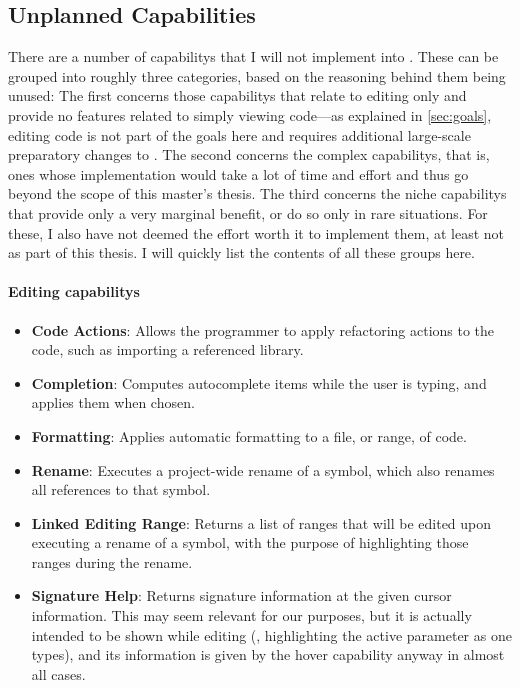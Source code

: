 \documentclass[../thesis]{subfiles}
\begin{document}
\subsection{Unplanned Capabilities}\label{subsec:unplanned}
There are a number of \glspl{capability} that I will not implement into \SEE{}.
These can be grouped into roughly three categories, based on the reasoning behind them being unused:
The first concerns those \glspl{capability} that relate to editing only and provide no features related to simply viewing code---as explained in \cref{sec:goals}, editing code is not part of the goals here and requires additional large-scale preparatory changes to \SEE{}.
The second concerns the complex \glspl{capability}, that is, ones whose implementation would take a lot of time and effort and thus go beyond the scope of this master's thesis.
The third concerns the niche \glspl{capability} that provide only a very marginal benefit, or do so only in rare situations.
For these, I also have not deemed the effort worth it to implement them, at least not as part of this thesis.
I will quickly list the contents of all these groups here.

\paragraph{Editing \glspl{capability}}
\begin{itemize}
	\item \textbf{Code Actions}: Allows the programmer to apply refactoring actions to the code, such as importing a referenced library.
	\item \textbf{Completion}: Computes autocomplete items while the user is typing, and applies them when chosen.
	\item \textbf{Formatting}: Applies automatic formatting to a file, or range, of code.
	\item \textbf{Rename}: Executes a project-wide rename of a symbol, which also renames all references to that symbol.
	\item \textbf{Linked Editing Range}: Returns a list of \glspl{range} that will be edited upon executing a rename of a symbol, with the purpose of highlighting those ranges during the rename.
	\item \textbf{Signature Help}: Returns signature information at the given cursor information.
	      This may seem relevant for our purposes, but it is actually intended to be shown while editing (\eg, highlighting the active parameter as one types), and its information is given by the hover \gls{capability} anyway in almost all cases.
\end{itemize}
\end{document}
